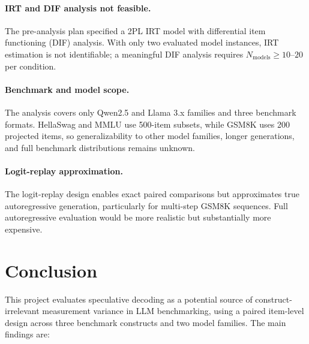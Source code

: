 \documentclass{article}
\begin{document}
\paragraph{IRT and DIF analysis not feasible.} The pre-analysis plan specified a 2PL IRT model with differential item functioning (DIF) analysis. With only two evaluated model instances, IRT estimation is not identifiable; a meaningful DIF analysis requires $N_{\text{models}} \geq 10$--$20$ per condition.

\paragraph{Benchmark and model scope.} The analysis covers only Qwen2.5 and Llama 3.x families and three benchmark formats. HellaSwag and MMLU use 500-item subsets, while GSM8K uses 200 projected items, so generalizability to other model families, longer generations, and full benchmark distributions remains unknown.

\paragraph{Logit-replay approximation.} The logit-replay design enables exact paired comparisons but approximates true autoregressive generation, particularly for multi-step GSM8K sequences. Full autoregressive evaluation would be more realistic but substantially more expensive.

\section{Conclusion}

This project evaluates speculative decoding as a potential source of construct-irrelevant measurement variance in LLM benchmarking, using a paired item-level design across three benchmark constructs and two model families. The main findings are:
\end{document}

